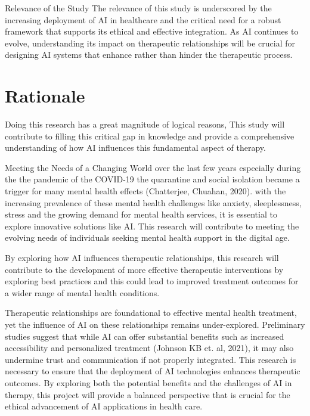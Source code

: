 \documentclass[12pt]{article}
\begin{document}
    Relevance of the Study
    The relevance of this study is underscored by the increasing deployment of AI in healthcare and the critical need for a robust framework that supports its ethical and effective integration. As AI continues to evolve, understanding its impact on therapeutic relationships will be crucial for designing AI systems that enhance rather than hinder the therapeutic process.

    \section{Rationale}

    Doing this research has a great magnitude of logical reasons, This study will contribute to filling this critical gap in knowledge and provide a comprehensive understanding of how AI influences this fundamental aspect of therapy.

    Meeting the Needs of a Changing World over the last few years especially during the the pandemic of the COVID-19 the quarantine and social isolation became a trigger for many mental health effects (Chatterjee, Chuahan, 2020). with the increasing prevalence of these mental health challenges like anxiety, sleeplessness, stress and the growing demand for mental health services, it is essential to explore innovative solutions like AI. This research will contribute to meeting the evolving needs of individuals seeking mental health support in the digital age.

    By exploring how AI influences therapeutic relationships, this research will contribute to the development of more effective therapeutic interventions by exploring best practices and this could lead to improved treatment outcomes for a wider range of mental health conditions.

    Therapeutic relationships are foundational to effective mental health treatment, yet the influence of AI on these relationships remains under-explored. Preliminary studies suggest that while AI can offer substantial benefits such as increased accessibility and personalized treatment (Johnson KB et. al, 2021), it may also undermine trust and communication if not properly integrated. This research is necessary to ensure that the deployment of AI technologies enhances therapeutic outcomes. By exploring both the potential benefits and the challenges of AI in therapy, this project will provide a balanced perspective that is crucial for the ethical advancement of AI applications in health care.
\end{document}
